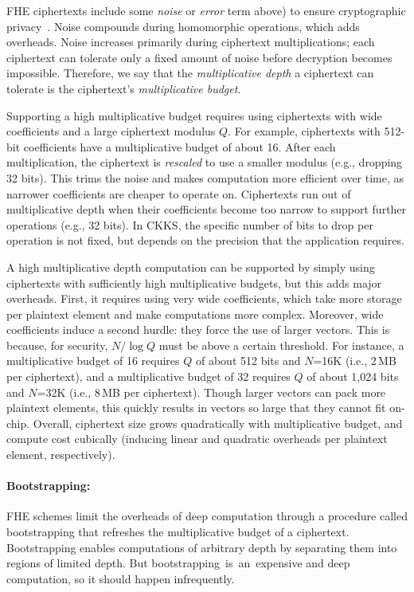 FHE ciphertexts include some \emph{noise} or \emph{error} %
term above) to ensure cryptographic privacy~\cite{lyubashevsky:tact10:ideal}.
Noise compounds during homomorphic operations, which adds overheads. Noise
increases primarily during ciphertext multiplications; each ciphertext can
tolerate only a fixed amount of noise before decryption becomes impossible.
Therefore, we say that the \emph{multiplicative depth} a ciphertext can
tolerate is the ciphertext's \emph{multiplicative budget}.

Supporting a high multiplicative budget requires using ciphertexts with wide
coefficients and a large ciphertext modulus $Q$. For example, ciphertexts with
512-bit coefficients have a multiplicative budget of about 16. After each
multiplication, the ciphertext is \emph{rescaled} to use a smaller modulus
(e.g., dropping 32 bits).
This trims the noise and makes computation more efficient over time, as
narrower coefficients are cheaper to operate on. Ciphertexts run out of
multiplicative depth when their coefficients become too narrow to support
further operations (e.g., 32 bits). In CKKS, the specific number of bits to
drop per operation is not fixed, but depends on the precision that the
application requires.

A high multiplicative depth computation can be supported by simply using
ciphertexts with sufficiently high multiplicative budgets, but this adds major
overheads. First, it requires using very wide coefficients, which take more
storage per plaintext element and make computations more complex. Moreover,
wide coefficients induce a second hurdle: they force the use of larger vectors.
This is because, for security, $N/\log Q$ must be above a certain threshold.
For instance, a multiplicative budget of 16 requires $Q$ of about 512 bits and
$N$=16K (i.e., 2\,MB per ciphertext), and a multiplicative budget of 32
requires $Q$ of about 1,024 bits and $N$=32K (i.e., 8\,MB per ciphertext).
Though larger vectors can pack more plaintext elements, this quickly results in
vectors so large that they cannot fit on-chip. Overall, ciphertext size grows
quadratically with multiplicative budget, and compute cost cubically (inducing
linear and quadratic overheads per plaintext element, respectively).


\figBootstrapping

\paragraph{Bootstrapping:} FHE schemes limit the overheads of deep computation
through a procedure called bootstrapping that refreshes the multiplicative
budget of a ciphertext. Bootstrapping enables computations of arbitrary depth
by separating them into regions of limited depth. But
bootstrapping~is~an~expensive and deep computation, so it should happen
infrequently.

